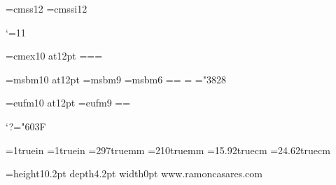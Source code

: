
\ifx\files\undefined  \fi

\files


\ifx\loadfont\undefined  \fi
\xiifonts \xiititles \rm
\let\bold=\xiibfonts \let\roman=\xiifonts
{}\utfon
\font\sf=cmss12
\font\sfit=cmssi12

\catcode`\@=11

\font\xiiex=cmex10 at12pt
=\xiiex {}=\xiiex {}=\xiiex

\font\xiibb=msbm10 at12pt
\font\ixbb=msbm9
\font\vibb=msbm6
\newfam\bbfam %
\textfont\bbfam=\xiibb \scriptfont\bbfam=\ixbb
\scriptscriptfont\bbfam=\vibb
\def\bb{\fam\bbfam\xiibb}
\mathchardef\subsetneq="3828

\font\xiifrak=eufm10 at12pt
\font\ixfrak=eufm9
\newfam\frakfam \textfont\frakfam=\xiifrak \scriptfont\frakfam=\ixfrak
\def\frak{\fam\frakfam\xiifrak}

\mathcode`?="603F %
\def\ifmath$#1${\relax\ifmmode #1\else$#1$\fi}
\def\QED{\ifmath$\diamond$}


\ifcase\pdfoutput
\else
 \pdfhorigin=1truein
 \pdfvorigin=1truein
 \pdfpageheight=297truemm
 \pdfpagewidth=210truemm
\fi
\hsize=15.92truecm \vsize=24.62truecm %
\advance\vsize -30pt

\def\twodigits#1{\ifnum #1<10 0\fi \number#1}
\def\todayiso{\number\year \twodigits\month \twodigits\day}
\let\version=\todayiso
\def\Folio{\ifnum\pageno<0
 \uppercase\expandafter{\romannumeral-\pageno}\else\number\pageno\fi}

\headline={\vrule height10.2pt depth4.2pt width0pt
 {\xiitt www.ramoncasares.com}\quad{\xiirm\version}\hfil
 \quad{\xiibf\jobname\quad\Folio}}%
\def\makeheadline{\vbox to 30pt{\colorblack\line{\the\headline}%
  \kern 1pt \hrule height 1pt\vfil\endcolor}\nointerlineskip}
\nopagenumbers


\def\cmykOrange{0 .7 .7 0} \def\cmykDarkOrange{0 .7 .7 .3}
\def\cmykPink{0 .5 0 0} \def\cmykDarkPink{0 .5 0 .3}


\newcount\secno
\newcount\ssecno
\newcount\thno
\newcount\parno
\let\presec=\empty
\def\presec{^^c2^^a7}%
\let\prepar=\empty
\def\prepar{^^c2^^b6}%

